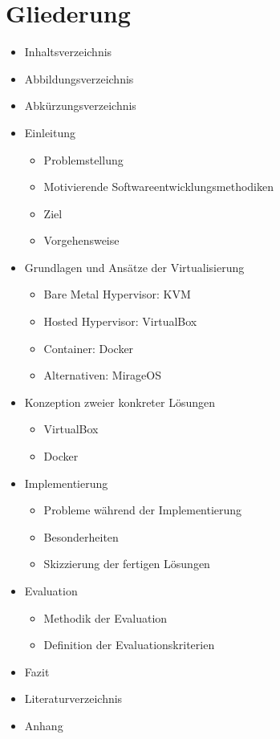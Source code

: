 \section{Gliederung}

\begin{itemize}
\item Inhaltsverzeichnis
\item Abbildungsverzeichnis
\item Abkürzungsverzeichnis
\item Einleitung
    \begin{itemize}
    \item Problemstellung
    \item Motivierende Softwareentwicklungsmethodiken
    \item Ziel
    \item Vorgehensweise
    \end{itemize}
\item Grundlagen und Ansätze der Virtualisierung
    \begin{itemize}
    \item Bare Metal Hypervisor: KVM
    \item Hosted Hypervisor: VirtualBox
    \item Container: Docker
    \item Alternativen: MirageOS
    \end{itemize}
\item Konzeption zweier konkreter Lösungen
    \begin{itemize}
    \item VirtualBox
    \item Docker
    \end{itemize}
\item Implementierung
    \begin{itemize}
    \item Probleme während der Implementierung
    \item Besonderheiten
    \item Skizzierung der fertigen Lösungen
    \end{itemize}
\item Evaluation
    \begin{itemize}
    \item Methodik der Evaluation
    \item Definition der Evaluationskriterien
    \end{itemize}
\item Fazit
\item Literaturverzeichnis
\item Anhang
\end{itemize}

